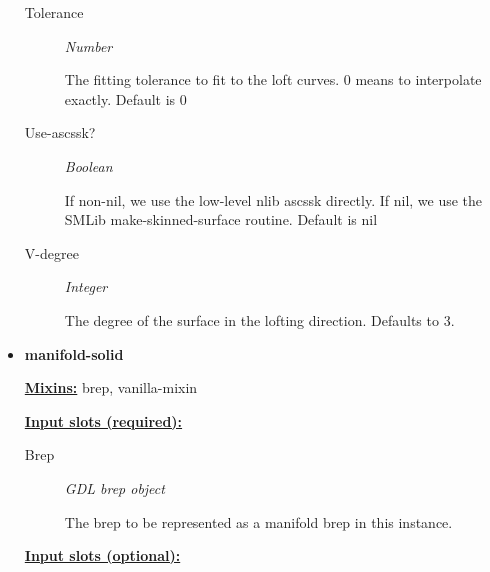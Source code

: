 \documentclass [11pt]{book}
\begin{document}
\begin{itemize}
\begin{description}
\item [Tolerance]
\emph{Number}

 The fitting tolerance to fit to the loft curves.
0 means to interpolate exactly. Default is 0




\item [Use-ascssk?]
\emph{Boolean}

 If non-nil, we use the low-level nlib ascssk directly. If nil, we use
the SMLib make-skinned-surface routine. Default is nil




\item [V-degree]
\emph{Integer}

 The degree of the surface in the lofting direction. Defaults to 3.




\end{description}







\item {}
\label{prim:manifold-solid}
\textbf{manifold-solid}


\textbf{
\underline{Mixins:}} brep, vanilla-mixin





\begin{description}

\end{description}








\textbf{
\underline{Input slots (required):}}

\begin{description}

\item [Brep]
\emph{GDL brep object}

 The brep to be represented as a manifold brep in this instance.




\end{description}






\textbf{
\underline{Input slots (optional):}}


\end{itemize}
\end{document}
